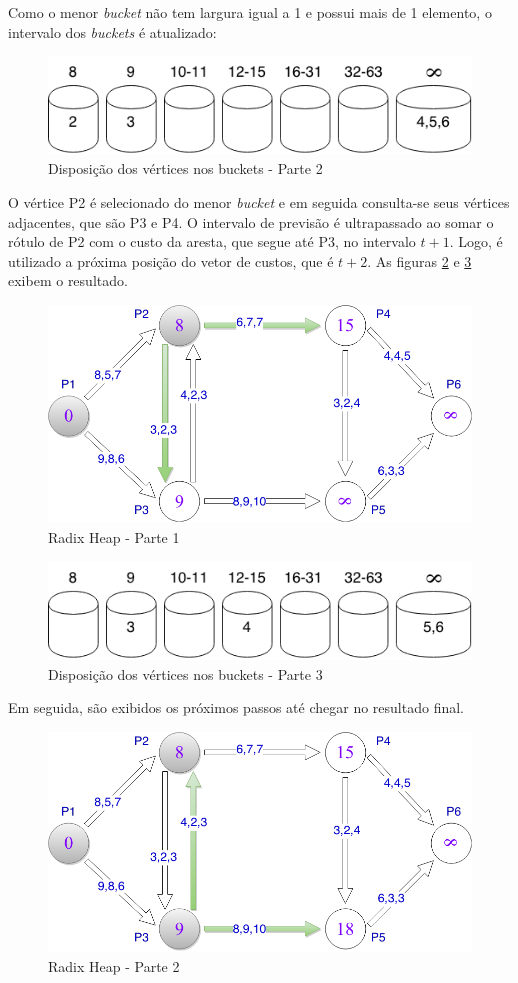 Como o menor \textit{bucket} não tem largura igual a 1 e possui mais de 1 elemento, o intervalo dos \textit{buckets}
é atualizado:

\begin{figure}[htbp]
\centering
 \includegraphics[width=.50\textwidth]{figuras/buckets2.png}
\caption{Disposição dos vértices nos buckets - Parte 2}
\label{fig:buckets2}
\end{figure}
\FloatBarrier

O vértice P2 é selecionado do menor \textit{bucket} e em seguida consulta-se seus vértices adjacentes, que são P3 e P4.
O intervalo de previsão é ultrapassado ao somar o rótulo de P2 com o custo da aresta, que segue até P3, no intervalo $t + 1$. Logo, 
é utilizado a próxima posição do vetor de custos, que é $t + 2$. As figuras \ref{fig:limitesup1} e \ref{fig:buckets3} exibem o resultado.

\begin{figure}[htbp]
\centering
 \includegraphics[width=.50\textwidth]{figuras/limitesup1.png}
\caption{Radix Heap - Parte 1}
\label{fig:limitesup1}
\end{figure}

\begin{figure}[htbp]
\centering
 \includegraphics[width=.50\textwidth]{figuras/buckets3.png}
\caption{Disposição dos vértices nos buckets - Parte 3}
\label{fig:buckets3}
\end{figure}
\FloatBarrier

Em seguida, são exibidos os próximos passos até chegar no resultado final.
\begin{figure}[htbp]
\centering
 \includegraphics[width=.50\textwidth]{figuras/limitesup2.png}
\caption{Radix Heap - Parte 2}
\label{fig:limitesup2}
\end{figure}

